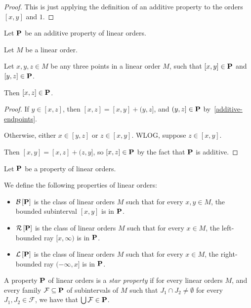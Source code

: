 \begin{proof}
  This is just applying the definition of an additive property
  to the orders $[x, y]$ and $1$.
\end{proof}

\begin{corollary}\label{additive-transitivity}
  Let $\mathbf{P}$ be an additive property of linear orders.

  Let $M$ be a linear order.

  Let $x, y, z \in M$ be any three points in a linear order $M$,
  such that $[x, y] \in \mathbf{P}$ and $[y, z] \in \mathbf{P}$.

  Then $[x, z] \in \mathbf{P}$.
\end{corollary}

\begin{proof}
  If $y \in [x, z]$, then $[x, z] = [x, y] + (y, z]$,
  and $(y, z] \in \mathbf{P}$ by~\cref{additive-endpoints}.

  Otherwise, either $x \in [y, z]$ or $z \in [x, y]$.
  WLOG, suppose $z \in [x, y]$.

  Then $[x, y] = [x, z] + (z, y]$,
  so $[x, z] \in \mathbf{P}$ by the fact that $\mathbf{P}$ is additive.
\end{proof}

\begin{definitions}\label{bounded-definitions}
  Let $\mathbf{P}$ be a property of linear orders.

  We define the following properties of linear orders:
  \begin{itemize}
    \item $\mathcal{B} \left[ {{\mathbf{P}}} \right]$ is the class of linear orders $M$ such that for every $x, y \in M$,
          the bounded subinterval $[x, y]$ is in $\mathbf{P}$.
    \item $\mathcal{R} \left[ {{\mathbf{P}}} \right]$ is the class of linear orders $M$ such that for every $x \in M$,
          the left-bounded ray $[x, \infty)$ is in $\mathbf{P}$.
    \item $\mathcal{L} \left[ {{\mathbf{P}}} \right]$ is the class of linear orders $M$ such that for every $x \in M$,
          the right-bounded ray $(-\infty, x]$ is in $\mathbf{P}$.
  \end{itemize}
\end{definitions}

\begin{definition}
  A property $\mathbf{P}$ of linear orders is a \emph{star property} if
  for every linear orders $M$, and every family $\mathcal{F} \subseteq \mathbf{P}$
  of subintervals of $M$ such that $J_1 \cap J_2 \ne \emptyset$
  for every $J_1, J_2 \in \mathcal{F}$, we have that
  $\bigcup \mathcal{F} \in \mathbf{P}$.
\end{definition}

